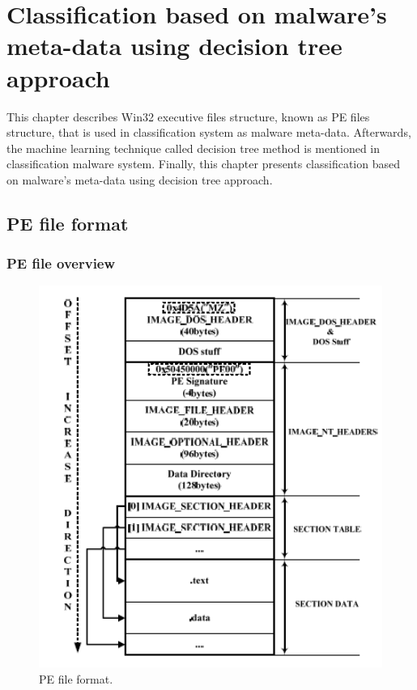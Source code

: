 \chapter{Classification based on malware's meta-data using decision tree approach}\label{chap:4}
%
%
This chapter describes Win32 executive files structure, known as PE files structure, that is used in classification system as malware meta-data. Afterwards, the machine learning technique called decision tree method is mentioned in classification malware system. Finally, this chapter presents classification based on malware's meta-data using decision tree approach. 

\section{PE file format}
\subsection{PE file overview}
\begin{figure}[h!]
\centering
\includegraphics[width=1\textwidth]{graph/pe1.png}
\caption{PE file format.}
\label{fig:pe1}
\end{figure}

